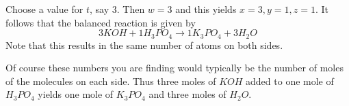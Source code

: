 \begin{solution}
Choose a value for $t$, say $3$. Then $w=3$ and this yields $x=3,y=1,z=1.$ It follows that the balanced
reaction is given by  
\begin{equation*}
3KOH+1H_{3}PO_{4}\rightarrow 1K_{3}PO_{4}+3H_{2}O
\end{equation*}
Note that this results in the same number of atoms on both sides.
\end{solution}

Of course these numbers you are finding would typically be the number of
moles of the molecules on each side. Thus three moles of $KOH$ added to one
mole of $H_{3}PO_{4}$ yields one mole of $K_{3}PO_{4}$ and three moles of 
$H_{2}O$.